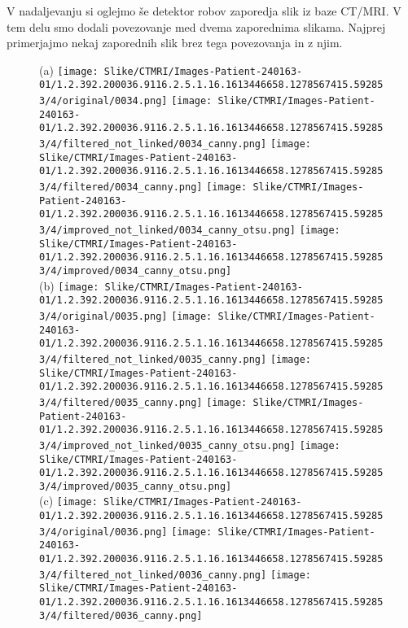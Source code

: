\documentclass{article}
\begin{document}
    V nadaljevanju si oglejmo še detektor robov zaporedja slik iz baze CT/MRI. V tem delu smo dodali povezovanje med dvema zaporednima slikama. 
    Najprej primerjajmo nekaj zaporednih slik brez tega povezovanja in z njim.
    \begin{figure}[H]
        \centering
        (a)
        \texttt{[image: Slike/CTMRI/Images-Patient-240163-01/1.2.392.200036.9116.2.5.1.16.1613446658.1278567415.592853/4/original/0034.png]}
        \texttt{[image: Slike/CTMRI/Images-Patient-240163-01/1.2.392.200036.9116.2.5.1.16.1613446658.1278567415.592853/4/filtered\_not\_linked/0034\_canny.png]} 
        \texttt{[image: Slike/CTMRI/Images-Patient-240163-01/1.2.392.200036.9116.2.5.1.16.1613446658.1278567415.592853/4/filtered/0034\_canny.png]}
        \texttt{[image: Slike/CTMRI/Images-Patient-240163-01/1.2.392.200036.9116.2.5.1.16.1613446658.1278567415.592853/4/improved\_not\_linked/0034\_canny\_otsu.png]} 
        \texttt{[image: Slike/CTMRI/Images-Patient-240163-01/1.2.392.200036.9116.2.5.1.16.1613446658.1278567415.592853/4/improved/0034\_canny\_otsu.png]} \\
        (b)
        \texttt{[image: Slike/CTMRI/Images-Patient-240163-01/1.2.392.200036.9116.2.5.1.16.1613446658.1278567415.592853/4/original/0035.png]}
        \texttt{[image: Slike/CTMRI/Images-Patient-240163-01/1.2.392.200036.9116.2.5.1.16.1613446658.1278567415.592853/4/filtered\_not\_linked/0035\_canny.png]} 
        \texttt{[image: Slike/CTMRI/Images-Patient-240163-01/1.2.392.200036.9116.2.5.1.16.1613446658.1278567415.592853/4/filtered/0035\_canny.png]}
        \texttt{[image: Slike/CTMRI/Images-Patient-240163-01/1.2.392.200036.9116.2.5.1.16.1613446658.1278567415.592853/4/improved\_not\_linked/0035\_canny\_otsu.png]} 
        \texttt{[image: Slike/CTMRI/Images-Patient-240163-01/1.2.392.200036.9116.2.5.1.16.1613446658.1278567415.592853/4/improved/0035\_canny\_otsu.png]} \\
        (c)
        \texttt{[image: Slike/CTMRI/Images-Patient-240163-01/1.2.392.200036.9116.2.5.1.16.1613446658.1278567415.592853/4/original/0036.png]}
        \texttt{[image: Slike/CTMRI/Images-Patient-240163-01/1.2.392.200036.9116.2.5.1.16.1613446658.1278567415.592853/4/filtered\_not\_linked/0036\_canny.png]} 
        \texttt{[image: Slike/CTMRI/Images-Patient-240163-01/1.2.392.200036.9116.2.5.1.16.1613446658.1278567415.592853/4/filtered/0036\_canny.png]}

\end{figure}
\end{document}
